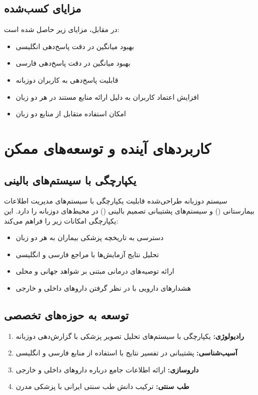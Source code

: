 \documentclass[11pt, a4paper, oneside]{book}
\begin{document}
	\subsection{مزایای کسب‌شده}
	در مقابل، مزایای زیر حاصل شده است:

	\begin{itemize}
		\item بهبود میانگین  در دقت پاسخ‌دهی انگلیسی
		\item بهبود میانگین  در دقت پاسخ‌دهی فارسی
		\item قابلیت پاسخ‌دهی به کاربران دوزبانه
		\item افزایش اعتماد کاربران به دلیل ارائه منابع مستند در هر دو زبان
		\item امکان استفاده متقابل از منابع دو زبان
	\end{itemize}

	\section{کاربردهای آینده و توسعه‌های ممکن}

	\subsection{یکپارچگی با سیستم‌های بالینی}
	سیستم  دوزبانه طراحی‌شده قابلیت یکپارچگی با سیستم‌های مدیریت اطلاعات بیمارستانی () و سیستم‌های پشتیبانی تصمیم بالینی () در محیط‌های دوزبانه را دارد. این یکپارچگی امکانات زیر را فراهم می‌کند:

	\begin{itemize}
		\item دسترسی به تاریخچه پزشکی بیماران به هر دو زبان
		\item تحلیل نتایج آزمایش‌ها با مراجع فارسی و انگلیسی
		\item ارائه توصیه‌های درمانی مبتنی بر شواهد جهانی و محلی
		\item هشدارهای دارویی با در نظر گرفتن داروهای داخلی و خارجی
	\end{itemize}

	\subsection{توسعه به حوزه‌های تخصصی}
	\begin{enumerate}
		\item \textbf{رادیولوژی:} یکپارچگی با سیستم‌های تحلیل تصویر پزشکی با گزارش‌دهی دوزبانه
		\item \textbf{آسیب‌شناسی:} پشتیبانی در تفسیر نتایج با استفاده از منابع فارسی و انگلیسی
		\item \textbf{داروسازی:} ارائه اطلاعات جامع درباره داروهای داخلی و خارجی
		\item \textbf{طب سنتی:} ترکیب دانش طب سنتی ایرانی با پزشکی مدرن
	\end{enumerate}
\end{document}
